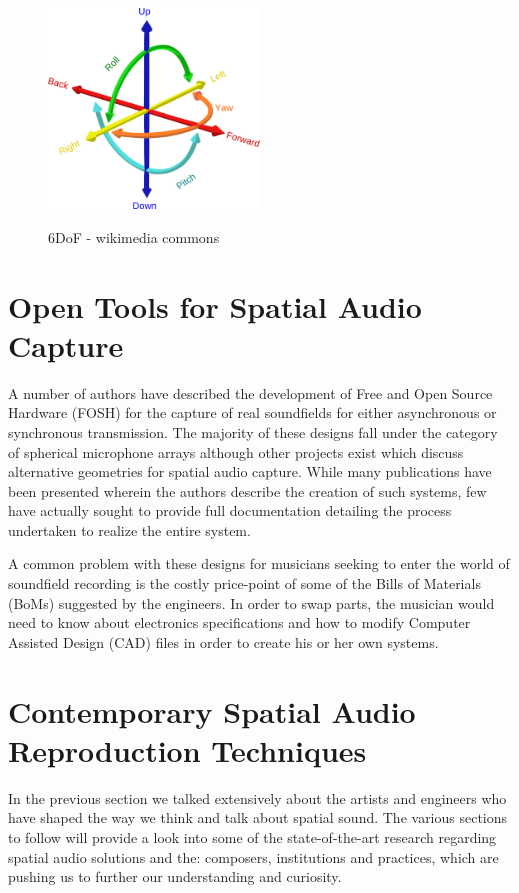 \begin{figure}[h!]%
\centering
\includegraphics[width=0.5\textwidth]{img/6DOF.svg.png} 
\label{fig:6DoF}
\caption{6DoF - wikimedia commons}
\end{figure}

\section{Open Tools for Spatial Audio Capture}

A number of authors have described the development of Free and Open Source Hardware (FOSH) for the capture of real soundfields for either asynchronous or synchronous transmission. The majority of these designs fall under the category of spherical microphone arrays although other projects exist which discuss alternative geometries for spatial audio capture. While many publications have been presented wherein the authors describe the creation of such systems, few have actually sought to provide full documentation detailing the process undertaken to realize the entire system. 

A common problem with these designs for musicians seeking to enter the world of soundfield recording is the costly price-point of some of the Bills of Materials (BoMs) suggested by the engineers. In order to swap parts, the musician would need to know about electronics specifications and how to modify Computer Assisted Design (CAD) files in order to create his or her own systems.


\section{Contemporary Spatial Audio Reproduction Techniques} \label{sec:contemp_audio_reproduction}

In the previous section we talked extensively about the artists and engineers who have shaped the way we think and talk about spatial sound. The various sections to follow will provide a look into some of the state-of-the-art research regarding spatial audio solutions and the: composers, institutions and practices, which are pushing us to further our understanding and curiosity. 

